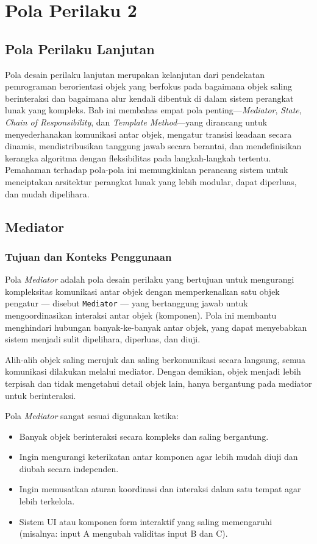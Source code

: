\chapter{Pola Perilaku 2}



\section{Pola Perilaku Lanjutan}

Pola desain perilaku lanjutan merupakan kelanjutan dari pendekatan pemrograman berorientasi objek yang berfokus pada bagaimana objek saling berinteraksi dan bagaimana alur kendali dibentuk di dalam sistem perangkat lunak yang kompleks. Bab ini membahas empat pola penting—\textit{Mediator}, \textit{State}, \textit{Chain of Responsibility}, dan \textit{Template Method}—yang dirancang untuk menyederhanakan komunikasi antar objek, mengatur transisi keadaan secara dinamis, mendistribusikan tanggung jawab secara berantai, dan mendefinisikan kerangka algoritma dengan fleksibilitas pada langkah-langkah tertentu. Pemahaman terhadap pola-pola ini memungkinkan perancang sistem untuk menciptakan arsitektur perangkat lunak yang lebih modular, dapat diperluas, dan mudah dipelihara.



\section{Mediator}
\subsection{Tujuan dan Konteks Penggunaan}

Pola \textit{Mediator} adalah pola desain perilaku yang bertujuan untuk mengurangi kompleksitas komunikasi antar objek dengan memperkenalkan satu objek pengatur — disebut \texttt{Mediator} — yang bertanggung jawab untuk mengoordinasikan interaksi antar objek (komponen). Pola ini membantu menghindari hubungan banyak-ke-banyak antar objek, yang dapat menyebabkan sistem menjadi sulit dipelihara, diperluas, dan diuji.

Alih-alih objek saling merujuk dan saling berkomunikasi secara langsung, semua komunikasi dilakukan melalui mediator. Dengan demikian, objek menjadi lebih terpisah dan tidak mengetahui detail objek lain, hanya bergantung pada mediator untuk berinteraksi.

Pola \textit{Mediator} sangat sesuai digunakan ketika:
\begin{itemize}
	\item Banyak objek berinteraksi secara kompleks dan saling bergantung.
	\item Ingin mengurangi keterikatan antar komponen agar lebih mudah diuji dan diubah secara independen.
	\item Ingin memusatkan aturan koordinasi dan interaksi dalam satu tempat agar lebih terkelola.
	\item Sistem UI atau komponen form interaktif yang saling memengaruhi (misalnya: input A mengubah validitas input B dan C).
\end{itemize}

